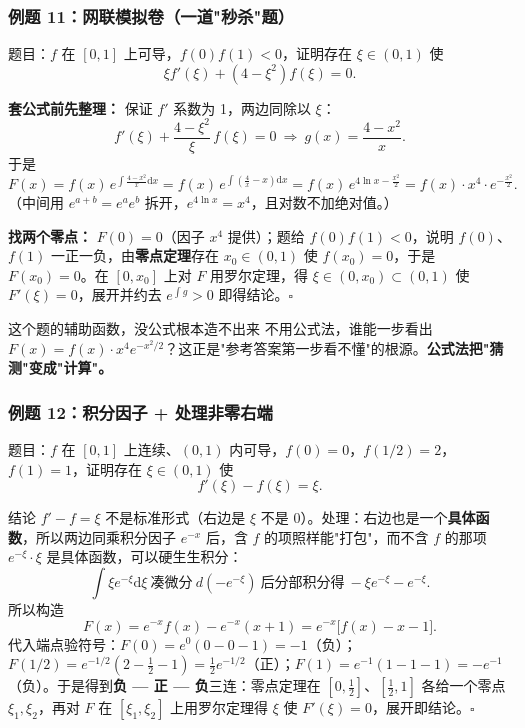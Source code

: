 \documentclass[a4paper]{article}
\begin{document}
\subsubsection{例题 11：网联模拟卷（一道"秒杀"题）}

题目：$f$ 在 $[0,1]$ 上可导，$f(0)f(1)<0$，证明存在 $\xi\in(0,1)$ 使
\[
\xi f'(\xi)+(4-\xi^2)f(\xi)=0 .
\]

\textbf{套公式前先整理：} 保证 $f'$ 系数为 1，两边同除以 $\xi$：
\[
f'(\xi)+\frac{4-\xi^2}{\xi}\,f(\xi)=0\ \Rightarrow\ g(x)=\frac{4-x^2}{x}.
\]
于是
\[
F(x)=f(x)\,e^{\int\frac{4-x^2}{x}\mathrm{d}x}=f(x)\,e^{\int(\frac4x-x)\mathrm{d}x}=f(x)\,e^{4\ln x-\frac{x^2}{2}}=f(x)\cdot x^4\cdot e^{-\frac{x^2}{2}}.
\]
（中间用 $e^{a+b}=e^a e^b$ 拆开，$e^{4\ln x}=x^4$，且对数不加绝对值。）

\textbf{找两个零点：} $F(0)=0$（因子 $x^4$ 提供）；题给 $f(0)f(1)<0$，说明 $f(0)$、$f(1)$ 一正一负，由\textbf{零点定理}存在 $x_0\in(0,1)$ 使 $f(x_0)=0$，于是 $F(x_0)=0$。在 $[0,x_0]$ 上对 $F$ 用罗尔定理，得 $\xi\in(0,x_0)\subset(0,1)$ 使 $F'(\xi)=0$，展开并约去 $e^{\int g}>0$ 即得结论。$\square$

\begin{warningbox}{这个题的辅助函数，没公式根本造不出来}
不用公式法，谁能一步看出 $F(x)=f(x)\cdot x^4 e^{-x^2/2}$？这正是"参考答案第一步看不懂"的根源。\textbf{公式法把"猜测"变成"计算"。}
\end{warningbox}

\subsubsection{例题 12：积分因子 + 处理非零右端}

题目：$f$ 在 $[0,1]$ 上连续、$(0,1)$ 内可导，$f(0)=0$，$f(1/2)=2$，$f(1)=1$，证明存在 $\xi\in(0,1)$ 使
\[
f'(\xi)-f(\xi)=\xi .
\]

结论 $f'-f=\xi$ 不是标准形式（右边是 $\xi$ 不是 0）。处理：右边也是一个\textbf{具体函数}，所以两边同乘积分因子 $e^{-x}$ 后，含 $f$ 的项照样能"打包"，而不含 $f$ 的那项 $e^{-\xi}\cdot \xi$ 是具体函数，可以硬生生积分：
\[
\int \xi e^{-\xi}\mathrm{d}\xi\ \text{凑微分}\ d(-e^{-\xi})\ \text{后分部积分得}\ -\xi e^{-\xi}-e^{-\xi}.
\]
所以构造
\[
F(x)=e^{-x}f(x)-e^{-x}(x+1)=e^{-x}\big[f(x)-x-1\big].
\]
代入端点验符号：$F(0)=e^{0}(0-0-1)=-1$（负）；$F(1/2)=e^{-1/2}(2-\frac12-1)=\frac12 e^{-1/2}$（正）；$F(1)=e^{-1}(1-1-1)=-e^{-1}$（负）。于是得到\textbf{负 — 正 — 负}三连：零点定理在 $[0,\frac12]$、$[\frac12,1]$ 各给一个零点 $\xi_1,\xi_2$，再对 $F$ 在 $[\xi_1,\xi_2]$ 上用罗尔定理得 $\xi$ 使 $F'(\xi)=0$，展开即结论。$\square$
\end{document}
